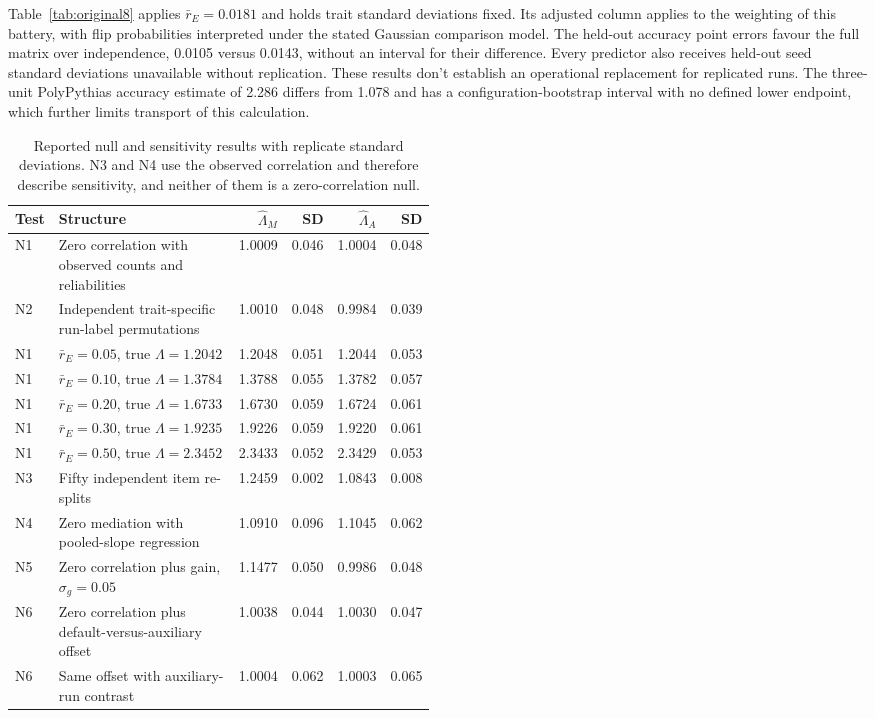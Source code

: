 Table~\ref{tab:original8} applies $\bar r_E=0.0181$ and holds trait standard deviations fixed. Its adjusted column applies to the weighting of this battery, with flip probabilities interpreted under the stated Gaussian comparison model. The held-out accuracy point errors favour the full matrix over independence, 0.0105 versus 0.0143, without an interval for their difference. Every predictor also receives held-out seed standard deviations unavailable without replication. These results don't establish an operational replacement for replicated runs. The three-unit PolyPythias accuracy estimate of 2.286 differs from 1.078 and has a configuration-bootstrap interval with no defined lower endpoint, which further limits transport of this calculation.

\begin{table}[!htb]
\centering
\caption{Reported null and sensitivity results with replicate standard deviations. N3 and N4 use the observed correlation and therefore describe sensitivity, and neither of them is a zero-correlation null.}
\label{tab:original9}
\small\setlength{\tabcolsep}{4pt}\renewcommand{\arraystretch}{1.12}
\begin{tabular}{lL{0.49\linewidth}rrrr}\toprule
Test & Structure & $\widehat\Lambda_M$ & SD & $\widehat\Lambda_A$ & SD\\\midrule
N1 & Zero correlation with observed counts and reliabilities & 1.0009 & 0.046 & 1.0004 & 0.048\\
N2 & Independent trait-specific run-label permutations & 1.0010 & 0.048 & 0.9984 & 0.039\\
N1 & $\bar r_E=0.05$, true $\Lambda=1.2042$ & 1.2048 & 0.051 & 1.2044 & 0.053\\
N1 & $\bar r_E=0.10$, true $\Lambda=1.3784$ & 1.3788 & 0.055 & 1.3782 & 0.057\\
N1 & $\bar r_E=0.20$, true $\Lambda=1.6733$ & 1.6730 & 0.059 & 1.6724 & 0.061\\
N1 & $\bar r_E=0.30$, true $\Lambda=1.9235$ & 1.9226 & 0.059 & 1.9220 & 0.061\\
N1 & $\bar r_E=0.50$, true $\Lambda=2.3452$ & 2.3433 & 0.052 & 2.3429 & 0.053\\
N3 & Fifty independent item re-splits & 1.2459 & 0.002 & 1.0843 & 0.008\\
N4 & Zero mediation with pooled-slope regression & 1.0910 & 0.096 & 1.1045 & 0.062\\
N5 & Zero correlation plus gain, $\sigma_g=0.05$ & 1.1477 & 0.050 & 0.9986 & 0.048\\
N6 & Zero correlation plus default-versus-auxiliary offset & 1.0038 & 0.044 & 1.0030 & 0.047\\
N6 & Same offset with auxiliary-run contrast & 1.0004 & 0.062 & 1.0003 & 0.065\\\bottomrule
\end{tabular}
\end{table}


